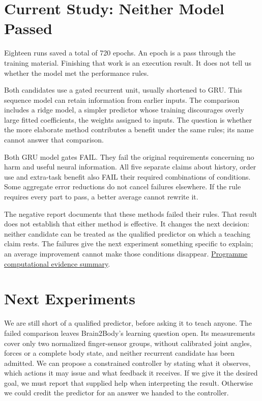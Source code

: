\section{Current Study: Neither Model Passed}

Eighteen runs saved a total of 720 epochs. An epoch is a pass through the training material. Finishing that work is an execution result. It does not tell us whether the model met the performance rules.\par

Both candidates use a gated recurrent unit, usually shortened to GRU. This sequence model can retain information from earlier inputs. The comparison includes a ridge model, a simpler predictor whose training discourages overly large fitted coefficients, the weights assigned to inputs. The question is whether the more elaborate method contributes a benefit under the same rules; its name cannot answer that comparison.\par

Both GRU model gates FAIL. They fail the original requirements concerning no harm and useful neural information. All five separate claims about history, order use and extra-task benefit also FAIL their required combinations of conditions. Some aggregate error reductions do not cancel failures elsewhere. If the rule requires every part to pass, a better average cannot rewrite it.\par

The negative report documents that these methods failed their rules. That result does not establish that either method is effective. It changes the next decision: neither candidate can be treated as the qualified predictor on which a teaching claim rests. The failures give the next experiment something specific to explain; an average improvement cannot make those conditions disappear. \href{research-evidence.json}{Programme computational evidence summary}.\par

\section{Next Experiments}

We are still short of a qualified predictor, before asking it to teach anyone. The failed comparison leaves Brain2Body's learning question open. Its measurements cover only two normalized finger-sensor groups, without calibrated joint angles, forces or a complete body state, and neither recurrent candidate has been admitted. We can propose a constrained controller by stating what it observes, which actions it may issue and what feedback it receives. If we give it the desired goal, we must report that supplied help when interpreting the result. Otherwise we could credit the predictor for an answer we handed to the controller.\par

